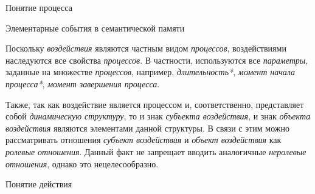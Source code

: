 \begin{frame}{\large Понятие процесса}
\begin{frame}{\large Элементарные события в семантической памяти}
\begin{frame}{}
\begin{SCn}
    \end{SCn}
\end{frame}
\begin{frame}{}
    \begin{SCn}
Поскольку \textit{воздействия} являются частным видом \textit{процессов}, воздействиями наследуются все свойства \textit{процессов}. В частности, используются все \textit{параметры}, заданные на множестве \textit{процессов}, например, \textit{длительность*}, \textit{момент начала процесса*}, \textit{момент завершения процесса\scnsupergroupsign}.

Также, так как воздействие является процессом и, соответственно, представляет собой \textit{динамическую структуру}, то и знак \textit{субъекта воздействия\scnrolesign}, и знак \textit{объекта воздействия\scnrolesign} являются элементами данной структуры. В связи с этим можно рассматривать отношения \textit{субъект воздействия\scnrolesign} и \textit{объект воздействия\scnrolesign} как \textit{ролевые отношения}. Данный факт не запрещает вводить аналогичные \textit{неролевые отношения}, однако это нецелесообразно.

    \end{SCn}
\end{frame}

\begin{frame}{Понятие действия}
\topline
\vspace{30}
 \\


\end{frame}
\end{frame}
\end{frame}
